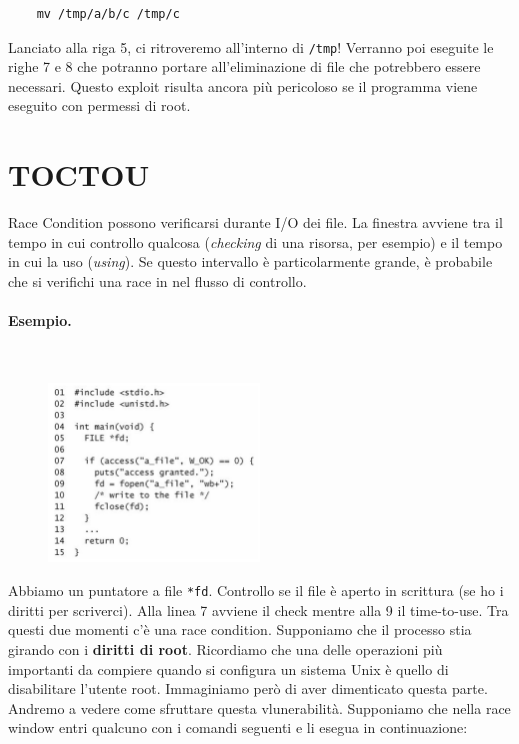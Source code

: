 \begin{lstlisting}
    mv /tmp/a/b/c /tmp/c
\end{lstlisting}

Lanciato alla riga 5, ci ritroveremo all'interno di \verb|/tmp|!
Verranno poi eseguite le righe 7 e 8 che potranno portare all'eliminazione
di file che potrebbero essere necessari. Questo exploit risulta ancora più
pericoloso se il programma viene eseguito con permessi di root.

\section{TOCTOU}

Race Condition possono verificarsi durante I/O dei file.
La finestra avviene tra il tempo in cui controllo qualcosa
(\textit{checking} di una risorsa, per esempio) e il tempo in cui la uso (\textit{using}).
Se questo intervallo è particolarmente grande, è probabile che si verifichi una race in nel flusso di controllo.

\paragraph{Esempio.}\ \\

\begin{figure}
    \centering
    \includegraphics[width=0.5\textwidth, keepaspectratio]{capitoli/secure_coding/img/cap_6/esempio_file.png}
\end{figure}

Abbiamo un puntatore a file \verb|*fd|.
Controllo se il file è aperto in scrittura (se ho i diritti per scriverci).
Alla linea 7 avviene il check mentre alla 9 il time-to-use.
Tra questi due momenti c’è una race condition.
Supponiamo che il processo stia girando con i \textbf{diritti di root}.
Ricordiamo che una delle operazioni più importanti da compiere quando si configura
un sistema Unix è quello di disabilitare l’utente root.
Immaginiamo però di aver dimenticato questa parte. Andremo a vedere come sfruttare
questa vlunerabilità.
Supponiamo che nella race window entri qualcuno con i comandi seguenti e li esegua in continuazione:

